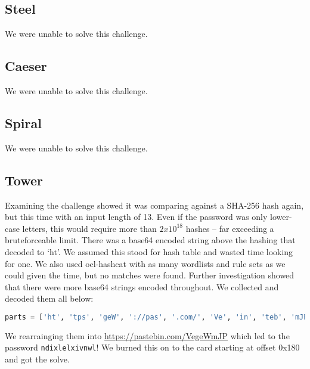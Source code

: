 \subsection{Steel}
We were unable to solve this challenge.

\subsection{Caeser}
We were unable to solve this challenge.

\subsection{Spiral}
We were unable to solve this challenge.

\subsection{Tower}
Examining the challenge showed it was comparing against a SHA-256 hash again, but this time with an input length of 13. Even if the password was only lower-case letters, this would require more than $2 x 10^{18}$ hashes -- far exceeding a bruteforceable limit. There was a base64 encoded string above the hashing that decoded to `ht'. We assumed this stood for hash table and wasted time looking for one. We also used ocl-hashcat with as many wordlists and rule sets as we could given the time, but no matches were found. Further investigation showed that there were more base64 strings encoded throughout. We collected and decoded them all below:

\begin{lstlisting}[language=python]
parts = ['ht', 'tps', 'geW', '://pas', '.com/', 'Ve', 'in', 'teb', 'mJP']
\end{lstlisting}

We rearrainging them into \url{https://pastebin.com/VegeWmJP}
which led to the password \texttt{ndixlelxivnwl}! We burned this on to the card starting at offset 0x180 and got the solve.
